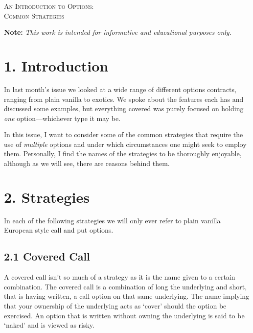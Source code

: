 \documentclass[11pt]{article}
\begin{document}

\begin{tcolorbox}
\begin{center}
    \large
    \textsc{An Introduction to Options: \\ Common Strategies}
\end{center}
\end{tcolorbox}

\begin{center}
\textbf{Note:} \textit{This work is intended for informative and educational purposes only.}
\end{center}

\section*{1. Introduction}
In last month's issue we looked at a wide range of different options contracts, ranging from plain vanilla to exotics. We spoke about the features each has and discussed some examples, but everything covered was purely focused on holding \textit{one} option––whichever type it may be.

In this issue, I want to consider some of the common strategies that require the use of \textit{multiple} options and under which circumstances one might seek to employ them. Personally, I find the names of the strategies to be thoroughly enjoyable, although as we will see, there are reasons behind them.

\section*{2. Strategies}
In each of the following strategies we will only ever refer to plain vanilla European style call and put options.

\subsection*{2.1 Covered Call}
A covered call isn't so much of a strategy as it is the name given to a certain combination. The covered call is a combination of long the underlying and short, that is having written, a call option on that same underlying. The name implying that your ownership of the underlying acts as `cover' should the option be exercised. An option that is written without owning the underlying is said to be `naked' and is viewed as risky. 
\end{document}
